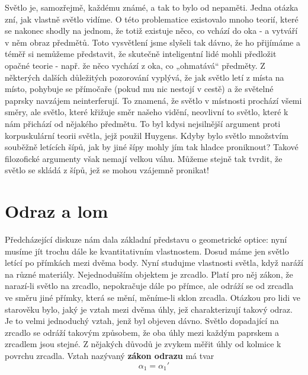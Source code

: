     Světlo je, samozřejmě, každému známé, a tak to bylo od nepaměti. Jedna otázka zní, jak vlastně 
    světlo vidíme. O této problematice existovalo mnoho teorií, které se nakonec shodly na jednom, 
    že totiž existuje něco, co vchází do oka - a vytváří v něm obraz předmětů. Toto vysvětlení jsme 
    slyšeli tak dávno, že ho přijímáme a téměř si nemůžeme představit, že skutečně inteligentní 
    lidé mohli předložit opačné teorie - např. že něco vychází z oka, co „ohmatává“ předměty. Z 
    některých dalších důležitých pozorování vyplývá, že jak světlo letí z místa na místo, pohybuje 
    se přímočaře (pokud mu nic nestojí v cestě) a že světelné paprsky navzájem neinterferují. To 
    znamená, že světlo v místnosti prochází všemi směry, ale světlo, které křižuje směr našeho 
    vidění, neovlivní to světlo, které k nám přichází od nějakého předmětu. To byl kdysi 
    nejsilnější argument proti korpuskulární teorii světla, jejž použil Huygens. Kdyby bylo světlo 
    množstvím souběžně letících šípů, jak by jiné šípy mohly jím tak hladce proniknout? Takové 
    filozofické argumenty však nemají velkou váhu. Můžeme stejně tak tvrdit, že světlo se skládá z 
    šípů, jež se mohou vzájemně pronikat!
    
  \section{Odraz a lom}\label{fyz:IchapXXVIsecII}
    Předcházející diskuze nám dala základní představu o geometrické optice: nyní musíme jít trochu 
    dále ke kvantitativním vlastnostem. Dosud máme jen světlo letící po přímkách mezi dvěma body. 
    Nyní studujme vlastnosti světla, když naráží na různé materiály. Nejednodušším objektem je 
    zrcadlo. Platí pro něj zákon, že narazí-li světlo na zrcadlo, nepokračuje dále po přímce, ale 
    odráží se od zrcadla ve směru jiné přímky, která se mění, měníme-li sklon zrcadla. Otázkou pro 
    lidi ve starověku bylo, jaký je vztah mezi dvěma úhly, jež charakterizují takový odraz. Je to 
    velmi jednoduchý vztah, jenž byl objeven dávno. Světlo dopadající na zrcadlo se odráží takovým 
    způsobem, že oba úhly mezi každým paprskem a zrcadlem jsou stejné. Z nějakých důvodů je zvykem 
    měřit úhly od kolmice k povrchu zrcadla. Vztah nazývaný \textbf{zákon odrazu} má tvar
    \begin{equation}\label{fyz:eq336}
      \alpha_1 = \alpha_1'
    \end{equation}

